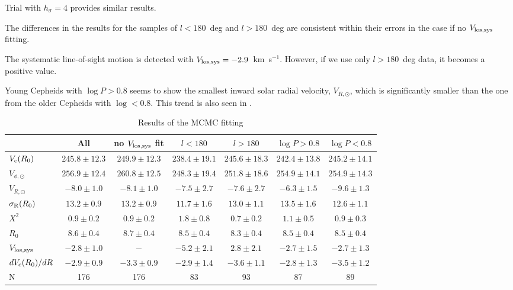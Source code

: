 \documentclass[11pt,a4paper]{article}
\begin{document}
Trial with $h_{\sigma}=4$ provides similar results. 

The differences in the results for the samples of $l<180$~deg and $l>180$~deg are consistent within their errors in the case if no $V_{\rm los,sys}$ fitting. 

The systematic line-of-sight motion is detected with $V_{\rm los,sys}=-2.9$~km~s$^{-1}$. However, if we use only $l>180$~deg data, it becomes a positive value. 

Young Cepheids with $\log P>0.8$ seems to show the smallest inward solar radial velocity, $V_{R,\odot}$, which is significantly smaller than the one from the older Cepheids with $\log<0.8$. This trend is also seen in \citet{vvb17a}.

\begin{table}
\centering
 \caption{Results of the MCMC fitting}
 \label{tab:MCMC-res}
 \begin{tabular}{lcccccc}
  \hline
                                        & All                 &  no $V_{\rm los,sys}$ fit & $l<180$                &   $l>180$ &           
 $\log P>0.8$ & $\log P<0.8$ \\
 \hline
 $V_{\rm c}(R_0)$            & $245.8\pm  12.3$ & $249.9\pm  12.3$ &  $238.4\pm  19.1$ & $245.6\pm  18.3$ &
  $242.4\pm  13.8$ & $245.2\pm  14.1$ \\
 $V_{\phi,\odot}$              & $256.9\pm  12.4$ & $260.8\pm  12.5$ &  $248.3\pm  19.4$ & $251.8\pm  18.6$  &
  $254.9\pm  14.1$ & $254.9\pm  14.3$ \\
 $V_{R,\odot}$                 & $ -8.0\pm   1.0$    & $ -8.1\pm   1.0$    &  $ -7.5\pm   2.7$    & $ -7.6\pm   2.7$   &
  $ -6.3\pm   1.5$    & $ -9.6\pm   1.3$ \\
 $\sigma_{\rm R}(R_0)$   & $ 13.2\pm   0.9$   & $ 13.2\pm   0.9$   &  $ 11.7\pm   1.6$    & $ 13.0\pm   1.1$    &
  $ 13.5\pm   1.6$   & $ 12.6\pm   1.1$ \\
 $X^2$                             & $  0.9\pm   0.2$   & $  0.9\pm   0.2$    &   $  1.8\pm   0.8$     &  $  0.7\pm   0.2$  &
  $  1.1\pm   0.5$    & $  0.9\pm   0.3$ \\
 $R_0$                             &  $  8.6\pm   0.4$    & $  8.7\pm   0.4$    &  $  8.5\pm   0.4$     & $  8.3\pm   0.4$   &
   $  8.5\pm   0.4$    & $  8.5\pm   0.4$ \\
 $V_{\rm los,sys}$            & $ -2.8\pm   1.0$    & $-$                       & $ -5.2\pm   2.1$       & $  2.8\pm   2.1$   &
   $ -2.7\pm   1.5$    & $ -2.7\pm   1.3$ \\
 $dV_{\rm c}(R_0)/dR$     & $ -2.9\pm   0.9$    & $ -3.3\pm   0.9$   & $ -2.9\pm   1.4$      &  $ -3.6\pm   1.1$ &
   $ -2.8\pm   1.3$    & $ -3.5\pm   1.2$ \\
 N                                      & 176                       & 176                     & 83                           &   93 &
  87                         & 89 \\
\hline
\end{tabular}
\end{table}
\end{document}
